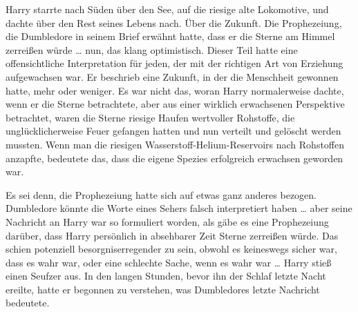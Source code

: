 Harry starrte nach Süden über den See, auf die riesige alte Lokomotive, und dachte über den Rest seines Lebens nach.
Über die Zukunft.
Die Prophezeiung, die Dumbledore in seinem Brief erwähnt hatte, dass er die Sterne am Himmel zerreißen würde … nun, das klang optimistisch. Dieser Teil hatte eine offensichtliche Interpretation für jeden, der mit der richtigen Art von Erziehung aufgewachsen war.
Er beschrieb eine Zukunft, in der die Menschheit gewonnen hatte, mehr oder weniger. Es war nicht das, woran Harry normalerweise dachte, wenn er die Sterne betrachtete, aber aus einer wirklich erwachsenen Perspektive betrachtet, waren die Sterne riesige Haufen wertvoller Rohstoffe, die unglücklicherweise Feuer gefangen hatten und nun verteilt und gelöscht werden mussten. Wenn man die riesigen Wasserstoff-Helium-Reservoirs nach Rohstoffen anzapfte, bedeutete das, dass die eigene Spezies erfolgreich erwachsen geworden war.

Es sei denn, die Prophezeiung hatte sich auf etwas ganz anderes bezogen. Dumbledore könnte die Worte eines Sehers falsch interpretiert haben … aber seine Nachricht an Harry war so formuliert worden, als gäbe es eine Prophezeiung darüber, dass Harry persönlich in absehbarer Zeit Sterne zerreißen würde. Das schien potenziell besorgniserregender zu sein, obwohl es keineswegs sicher war, dass es wahr war, oder eine schlechte Sache, wenn es wahr war … Harry stieß einen Seufzer aus. In den langen Stunden, bevor ihn der Schlaf letzte Nacht ereilte, hatte er begonnen zu verstehen, was Dumbledores letzte Nachricht bedeutete.


